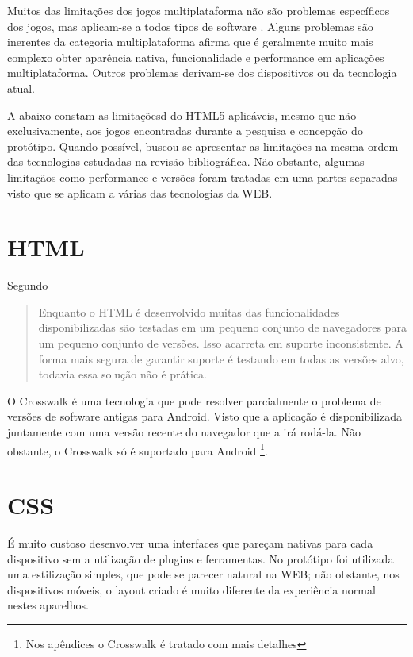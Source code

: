 
Muitos das limitações dos jogos multiplataforma não são
problemas específicos dos jogos, mas aplicam-se a todos tipos
de software \autocite[pp. 3]{currentStateCrossPlatform}. Alguns
problemas são inerentes da categoria multiplataforma \cite[pp.
7 ]{viabilityBusinessApplications} afirma que é geralmente muito
mais complexo obter aparência nativa, funcionalidade e performance
em aplicações multiplataforma. Outros problemas derivam-se dos
dispositivos ou da tecnologia atual.

A abaixo constam as limitaçõesd do HTML5 aplicáveis, mesmo que não
exclusivamente, aos jogos encontradas durante a pesquisa e concepção
do protótipo. Quando possível, buscou-se apresentar as limitações
na mesma ordem das tecnologias estudadas na revisão bibliográfica.
Não obstante, algumas limitaçãos como performance e versões foram
tratadas em uma partes separadas visto que se aplicam a várias das
tecnologias da WEB.

\section{HTML}

Segundo \cite{crossPlatformMobileGame}
\begin{quote}
Enquanto o HTML é desenvolvido muitas das funcionalidades
disponibilizadas são testadas em um pequeno conjunto de navegadores
para um pequeno conjunto de versões. Isso acarreta em suporte
inconsistente. A forma mais segura de garantir suporte é testando em
todas as versões alvo, todavia essa solução não é prática.
\end{quote}

O Crosswalk é uma tecnologia que pode resolver parcialmente o problema
de versões de software antigas para Android. Visto que a aplicação
é disponibilizada juntamente com uma versão recente do navegador que
a irá rodá-la. Não obstante, o Crosswalk só é suportado
para Android \footnote{Nos apêndices o Crosswalk é tratado com mais
detalhes}.


\section{CSS}

É muito custoso desenvolver uma interfaces que pareçam nativas para
cada dispositivo sem a utilização de plugins e ferramentas. No
protótipo foi utilizada uma estilização simples, que pode se parecer
natural na WEB; não obstante, nos dispositivos móveis, o layout criado
é muito diferente da experiência normal nestes aparelhos.

